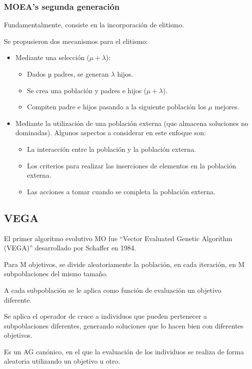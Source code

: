 \documentclass[12pt, twoside, openright]{report} %
\begin{document}
\subsubsection{MOEA’s segunda generación}
Fundamentalmente, consiste en la incorporación de elitismo.

Se propusieron dos mecanismos para el elitismo:
\begin{itemize}
	\item Mediante una selección ($\mu + \lambda$):
	\begin{itemize}
		\item Dados µ padres, se generan $\lambda$ hijos.
		\item Se crea una población y padres e hijos ($\mu + \lambda$).
		\item Compiten padre e hijos pasando a la siguiente población los $\mu$ mejores.
	\end{itemize}
	\pagebreak
	\item Mediante la utilización de una población externa (que almacena soluciones no dominadas). Algunos aspectos a considerar en este enfoque son:
	\begin{itemize}
		\item La interacción entre la población y la población externa.
		\item Los criterios para realizar las inserciones de elementos en la población externa.
		\item Las acciones a tomar cuando se completa la población externa.
	\end{itemize}
\end{itemize}

\subsection{VEGA}
El primer algoritmo evolutivo MO fue “Vector Evaluated Genetic Algorithm (VEGA)” desarrollado por Schaffer en 1984.

Para M objetivos, se divide aleatoriamente la población, en cada iteración, en M subpoblaciones del mismo tamaño.

A cada subpoblación se le aplica como función de evaluación un objetivo diferente.

Se aplica el operador de cruce a individuos que pueden pertenecer a subpoblaciones diferentes, generando soluciones que lo hacen bien con diferentes objetivos.

Es un AG canónico, en el que la evaluación de los individuos se realiza de forma aleatoria utilizando un objetivo u otro.
\end{document}
